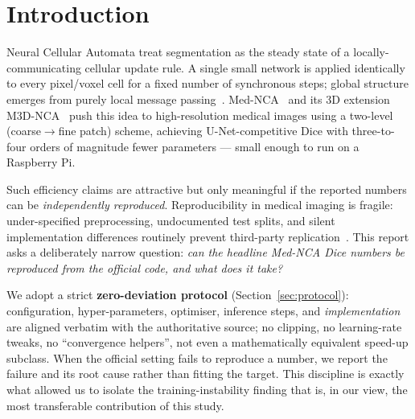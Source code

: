 \documentclass[10pt,twocolumn]{article}
\begin{document}
\section{Introduction}
\label{sec:intro}

Neural Cellular Automata treat segmentation as the steady state of a
locally-communicating cellular update rule. A single small network is
applied identically to every pixel/voxel cell for a fixed number of
synchronous steps; global structure emerges from purely local message
passing~\cite{mordvintsev2020growing}. Med-NCA~\cite{kalkhof2023mednca}
and its 3D extension M3D-NCA~\cite{kalkhof2023m3dnca} push this idea to
high-resolution medical images using a two-level (coarse$\rightarrow$fine
patch) scheme, achieving U-Net-competitive Dice with three-to-four orders
of magnitude fewer parameters --- small enough to run on a Raspberry Pi.

Such efficiency claims are attractive but only meaningful if the reported
numbers can be \emph{independently reproduced}. Reproducibility in medical
imaging is fragile: under-specified preprocessing, undocumented test
splits, and silent implementation differences routinely prevent
third-party replication~\cite{ridge2024,nbk597469}. This report asks a
deliberately narrow question: \emph{can the headline Med-NCA Dice numbers
be reproduced from the official code, and what does it take?}

We adopt a strict \textbf{zero-deviation protocol}
(Section~\ref{sec:protocol}): configuration, hyper-parameters, optimiser,
inference steps, and \emph{implementation} are aligned verbatim with the
authoritative source; no clipping, no learning-rate tweaks, no
``convergence helpers'', not even a mathematically equivalent speed-up
subclass. When the official setting fails to reproduce a number, we report
the failure and its root cause rather than fitting the target. This
discipline is exactly what allowed us to isolate the training-instability
finding that is, in our view, the most transferable contribution of this
study.
\end{document}

